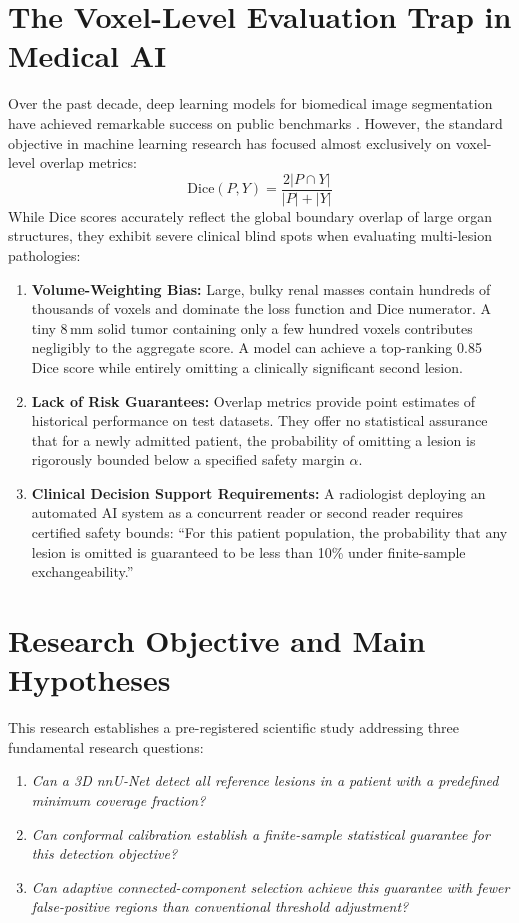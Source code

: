 \documentclass[11pt,a4paper]{report}
\begin{document}
\section{The Voxel-Level Evaluation Trap in Medical AI}
Over the past decade, deep learning models for biomedical image segmentation have achieved remarkable success on public benchmarks \cite{Isensee2021nnunet,Isensee2024nnunetRevisited}. However, the standard objective in machine learning research has focused almost exclusively on voxel-level overlap metrics:
\begin{equation}
\mathrm{Dice}(P, Y) = \frac{2 |P \cap Y|}{|P| + |Y|}
\end{equation}
While Dice scores accurately reflect the global boundary overlap of large organ structures, they exhibit severe clinical blind spots when evaluating multi-lesion pathologies:
\begin{enumerate}
    \item \textbf{Volume-Weighting Bias:} Large, bulky renal masses contain hundreds of thousands of voxels and dominate the loss function and Dice numerator. A tiny $8$\,mm solid tumor containing only a few hundred voxels contributes negligibly to the aggregate score. A model can achieve a top-ranking 0.85 Dice score while entirely omitting a clinically significant second lesion.
    \item \textbf{Lack of Risk Guarantees:} Overlap metrics provide point estimates of historical performance on test datasets. They offer no statistical assurance that for a newly admitted patient, the probability of omitting a lesion is rigorously bounded below a specified safety margin $\alpha$.
    \item \textbf{Clinical Decision Support Requirements:} A radiologist deploying an automated AI system as a concurrent reader or second reader requires certified safety bounds: ``For this patient population, the probability that any lesion is omitted is guaranteed to be less than 10\% under finite-sample exchangeability.''
\end{enumerate}

\section{Research Objective and Main Hypotheses}
This research establishes a pre-registered scientific study addressing three fundamental research questions:
\begin{enumerate}
    \item \emph{Can a 3D nnU-Net detect all reference lesions in a patient with a predefined minimum coverage fraction?}
    \item \emph{Can conformal calibration establish a finite-sample statistical guarantee for this detection objective?}
    \item \emph{Can adaptive connected-component selection achieve this guarantee with fewer false-positive regions than conventional threshold adjustment?}
\end{enumerate}
\end{document}
